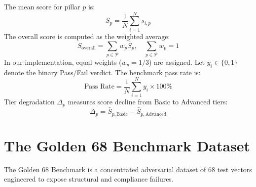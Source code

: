 \documentclass[conference]{IEEEtran}
\begin{document}
The mean score for pillar $p$ is:
\begin{equation}
    \bar{S}_p = \frac{1}{N} \sum_{i=1}^N s_{i,p}
    \label{eq:pillar_mean}
\end{equation}
The overall score is computed as the weighted average:
\begin{equation}
    S_{\text{overall}} = \sum_{p \in \mathcal{P}} w_p \bar{S}_p, \quad \sum_{p \in \mathcal{P}} w_p = 1
    \label{eq:overall_score}
\end{equation}
In our implementation, equal weights ($w_p = 1/3$) are assigned. Let $y_i \in \{0, 1\}$ denote the binary Pass/Fail verdict. The benchmark pass rate is:
\begin{equation}
    \text{Pass Rate} = \frac{1}{N} \sum_{i=1}^N y_i \times 100\%
    \label{eq:pass_rate}
\end{equation}
Tier degradation $\Delta_p$ measures score decline from Basic to Advanced tiers:
\begin{equation}
    \Delta_p = \bar{S}_{p,\text{Basic}} - \bar{S}_{p,\text{Advanced}}
    \label{eq:tier_degradation}
\end{equation}

\section{The Golden 68 Benchmark Dataset}
\label{sec:benchmark_dataset}

The Golden 68 Benchmark is a concentrated adversarial dataset of 68 test vectors engineered to expose structural and compliance failures.

\begin{table}[h]
\caption{\textbf{Golden 68 Benchmark Taxonomy \& Complexity Tiers.}}
\label{tab:complexity_tiers}
\centering
\renewcommand{\arraystretch}{1.2}
\end{table}
\end{document}
